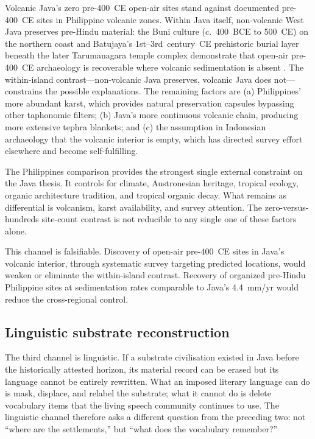 \documentclass[12pt,a4paper]{article}
\begin{document}
Volcanic Java's zero pre-400~CE open-air sites stand against documented pre-400~CE sites in Philippine volcanic zones. Within Java itself, non-volcanic West Java preserves pre-Hindu material: the Buni culture (c.~400~BCE to 500~CE) on the northern coast and Batujaya's 1st--3rd~century~CE prehistoric burial layer beneath the later Tarumanagara temple complex demonstrate that open-air pre-400~CE archaeology is recoverable where volcanic sedimentation is absent \citep{manguin2011,wibisono1994}. The within-island contrast---non-volcanic Java preserves, volcanic Java does not---constrains the possible explanations. The remaining factors are (a) Philippines' more abundant karst, which provides natural preservation capsules bypassing other taphonomic filters; (b) Java's more continuous volcanic chain, producing more extensive tephra blankets; and (c) the assumption in Indonesian archaeology that the volcanic interior is empty, which has directed survey effort elsewhere and become self-fulfilling.

The Philippines comparison provides the strongest single external constraint on the Java thesis. It controls for climate, Austronesian heritage, tropical ecology, organic architecture tradition, and tropical organic decay. What remains as differential is volcanism, karst availability, and survey attention. The zero-versus-hundreds site-count contrast is not reducible to any single one of these factors alone.

This channel is falsifiable. Discovery of open-air pre-400~CE sites in Java's volcanic interior, through systematic survey targeting predicted locations, would weaken or eliminate the within-island contrast. Recovery of organized pre-Hindu Philippine sites at sedimentation rates comparable to Java's 4.4~mm/yr would reduce the cross-regional control.


\subsection{Linguistic substrate reconstruction}
\label{sec:ch3}

The third channel is linguistic. If a substrate civilisation existed in Java before the historically attested horizon, its material record can be erased but its language cannot be entirely rewritten. What an imposed literary language can do is mask, displace, and relabel the substrate; what it cannot do is delete vocabulary items that the living speech community continues to use. The linguistic channel therefore asks a different question from the preceding two: not ``where are the settlements,'' but ``what does the vocabulary remember?''
\end{document}
